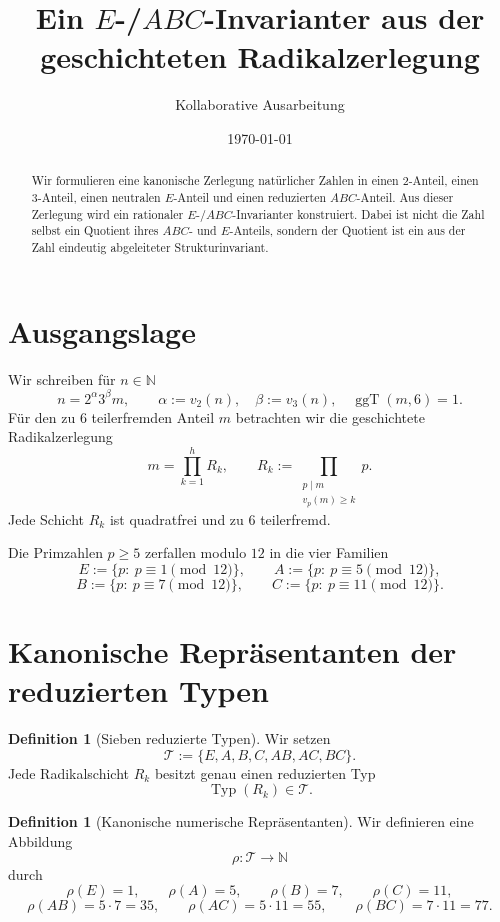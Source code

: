 \documentclass[11pt,a4paper]{article}
\title{Ein \(E\!\)-/\(ABC\)-Invarianter aus der geschichteten Radikalzerlegung}
\author{Kollaborative Ausarbeitung}
\date{\today}
\theoremstyle{definition}
\newtheorem{definition}[satz]{Definition}
\theoremstyle{remark}
\newcommand{\N}{\mathbb{N}}
\newcommand{\ggT}{\operatorname{ggT}}
\newcommand{\Typ}{\operatorname{Typ}}
\begin{document}
	\maketitle
	
	\begin{abstract}
		Wir formulieren eine kanonische Zerlegung natürlicher Zahlen in einen \(2\)-Anteil, einen
		\(3\)-Anteil, einen neutralen \(E\)-Anteil und einen reduzierten \(ABC\)-Anteil.
		Aus dieser Zerlegung wird ein rationaler \(E\!\)-/\(ABC\)-Invarianter konstruiert.
		Dabei ist nicht die Zahl selbst ein Quotient ihres \(ABC\)- und \(E\)-Anteils,
		sondern der Quotient ist ein aus der Zahl eindeutig abgeleiteter Strukturinvariant.
	\end{abstract}
	
	\section{Ausgangslage}
	
	Wir schreiben für \(n\in\N\)
	\[
	n = 2^\alpha 3^\beta m,
	\qquad
	\alpha := v_2(n),\quad \beta := v_3(n),\quad \ggT(m,6)=1.
	\]
	Für den zu \(6\) teilerfremden Anteil \(m\) betrachten wir die geschichtete Radikalzerlegung
	\[
	m=\prod_{k=1}^h R_k,
	\qquad
	R_k:=\prod_{\substack{p\mid m\\ v_p(m)\ge k}} p.
	\]
	Jede Schicht \(R_k\) ist quadratfrei und zu \(6\) teilerfremd.
	
	Die Primzahlen \(p\ge 5\) zerfallen modulo \(12\) in die vier Familien
	\[
	E:=\{p:\ p\equiv 1 \pmod{12}\},\qquad
	A:=\{p:\ p\equiv 5 \pmod{12}\},
	\]
	\[
	B:=\{p:\ p\equiv 7 \pmod{12}\},\qquad
	C:=\{p:\ p\equiv 11 \pmod{12}\}.
	\]
	
	\section{Kanonische Repräsentanten der reduzierten Typen}
	
	\begin{definition}[Sieben reduzierte Typen]
		Wir setzen
		\[
		\mathcal{T}:=\{E,A,B,C,AB,AC,BC\}.
		\]
		Jede Radikalschicht \(R_k\) besitzt genau einen reduzierten Typ
		\[
		\Typ(R_k)\in\mathcal{T}.
		\]
	\end{definition}
	
	\begin{definition}[Kanonische numerische Repräsentanten]
		Wir definieren eine Abbildung
		\[
		\rho:\mathcal{T}\to\N
		\]
		durch
		\[
		\rho(E)=1,\qquad \rho(A)=5,\qquad \rho(B)=7,\qquad \rho(C)=11,
		\]
		\[
		\rho(AB)=5\cdot 7=35,\qquad
		\rho(AC)=5\cdot 11=55,\qquad
		\rho(BC)=7\cdot 11=77.
		\]
	\end{definition}
	
\end{document}
